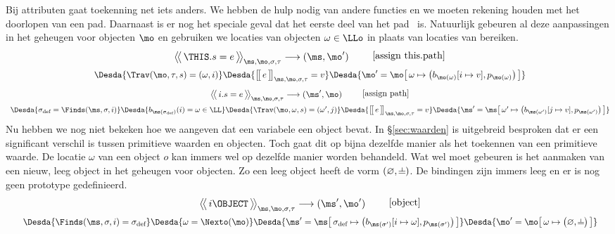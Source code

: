 Bij attributen gaat toekenning net iets anders. We hebben de hulp nodig van andere functies en we moeten rekening houden met het doorlopen van een pad. Daarnaast is er nog het speciale geval dat het eerste deel van het pad \THIS\ is. Natuurlijk gebeuren al deze aanpassingen in het geheugen voor objecten $\mo$ en gebruiken we locaties van objecten $\omega\in\LLo$ in plaats van locaties van bereiken.
%
\begin{gather*}
  \AxiomC{$
    \Config{\THIS.s = e}{\ms, \mo, \sigma, \tau}
    \longrightarrow
    (\ms, \mo')
  $}
  {\DisplayProof}
  \tag*{[assign this.path]} \\
  \Desdas{
    \Desda{\Trav(\mo, \tau, s) = (\omega, i)}
    \Desda{\Surr{e}_{\ms, \mo, \sigma, \tau} = v}
    \Desda{\mo'= \mo \surr{ \omega \mapsto \big(b_{\mo(\omega)}[ i \mapsto v ], p_{\mo(\omega)}\big) }}
  }
\end{gather*}
%
\begin{gather*}
  \AxiomC{$
    \Config{i.s = e}{\ms, \mo, \sigma, \tau}
    \longrightarrow
    (\ms', \mo)
  $}
  {\DisplayProof}
  \tag*{[assign path]} \\
  \Desdas{
    \Desda{\sigma_\text{def} = \Finds(\ms, \sigma, i)}
    \Desda{b_{\ms(\sigma_\text{def})}(i) = \omega \in \LL}
    \Desda{\Trav(\mo, \omega, s) = (\omega', j)}
    \Desda{\Surr{e}_{\ms, \mo, \sigma, \tau} = v}
    \Desda{\ms'= \ms \surr{ \omega' \mapsto \big(b_{\ms(\omega')}[ j \mapsto v ], p_{\ms(\omega')}\big) }}
  }
\end{gather*}
%
Nu hebben we nog niet bekeken hoe we aangeven dat een variabele een object bevat. In §\ref{sec:waarden} is uitgebreid besproken dat er een significant verschil is tussen primitieve waarden en objecten. Toch gaat dit op bijna dezelfde manier als het toekennen van een primitieve waarde. De locatie $\omega$ van een object $o$ kan immers wel op dezelfde manier worden behandeld. Wat wel moet gebeuren is het aanmaken van een nieuw, leeg object in het geheugen voor objecten. Zo een leeg object heeft de vorm $(\varnothing, \nil)$. De bindingen zijn immers leeg en er is nog geen prototype gedefinieerd.
%
\begin{gather*}
  \AxiomC{$
    \Config{i \OBJECT}{\ms, \mo, \sigma, \tau}
    \longrightarrow
    (\ms', \mo')
  $}
  {\DisplayProof}
  \tag*{[object]} \\
  \Desdas{
    \Desda{\Finds(\ms, \sigma, i) = \sigma_\text{def}}
    \Desda{\omega = \Nexto(\mo)}
    \Desda{\ms' = \ms \surr{ \sigma_\text{def} \mapsto \big(b_{\ms(\sigma')}[i\mapsto \omega], p_{\ms(\sigma')}\big) }}
    \Desda{\mo' = \mo \surr{ \omega \mapsto \big(\varnothing, \BOT\big) }}
  }
\end{gather*}

